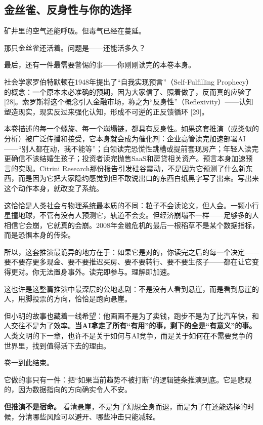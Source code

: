 \documentclass[11pt,a4paper]{ctexart}
\begin{document}
\subsection{金丝雀、反身性与你的选择}

矿井里的空气还能呼吸。但毒气已经在蔓延。

那只金丝雀还活着。问题是——还能活多久？

最后，还有一件最需要警惕的事——你刚刚读完的本卷本身。

社会学家罗伯特\textperiodcentered{}默顿在1948年提出了“自我实现预言”（Self-Fulfilling Prophecy）的概念：一个原本未必准确的预期，因为大家信了、照着做了，反而真的应验了 [28]。索罗斯将这个概念引入金融市场，称之为“反身性”（Reflexivity）——认知塑造现实，现实反过来强化认知，形成不可逆的正反馈循环 [29]。

本卷描述的每一个螺旋、每一个崩塌链，都具有反身性。如果这套推演（或类似的分析）被广泛传播和接受，它本身就会成为催化剂：企业高管读完加速部署AI——“别人都在动，我不能等”；白领读完恐慌性跳槽或提前套现房产；年轻人读完更确信不该结婚生孩子；投资者读完抛售SaaS和房贷相关资产。预言本身加速预言的实现。Citrini Research那份报告引发硅谷震动，不是因为它预测了什么新东西，而是因为它把大家隐约感觉到但不敢说出口的东西白纸黑字写了出来。写出来这个动作本身，就改变了系统。

这恰恰是人类社会与物理系统最本质的不同：粒子不会读论文，但人会。一颗小行星撞地球，不管有没有人预测它，轨道不会变。但经济崩塌不一样——足够多的人相信它会崩，它就真的会崩。2008年金融危机的最后一根稻草不是某个数据指标，而是恐惧本身的传染。

所以，这套推演最诡异的地方在于：如果它是对的，你读完之后的每一个决定——要不要存更多现金、要不要推迟买房、要不要转行、要不要生孩子——都在让它变得更对。你无法置身事外。读完即参与。理解即加速。

这也许是这整篇推演中最深层的公地悲剧：不是没有人看到悬崖，而是看到悬崖的人，用脚投票的方向，恰恰是跑向悬崖。

但小明的故事也藏着一线希望：他画画不是为了卖钱，跑步不是为了比汽车快，和人交往不是为了效率。\textbf{当AI拿走了所有“有用”的事，剩下的全是“有意义”的事。} 人类文明的下一章，也许不是关于如何与AI竞争，而是关于如何在不需要竞争的世界里，找到值得活下去的理由。

卷一到此结束。

它做的事只有一件：把“如果当前趋势不被打断”的逻辑链条推演到底。它是悲观的，因为数据指向的方向确实令人不安。

\textbf{但推演不是宿命。} 看清悬崖，不是为了幻想全身而退，而是为了在还能选择的时候，分清哪些风险可以避开、哪些冲击只能减轻。
\end{document}

